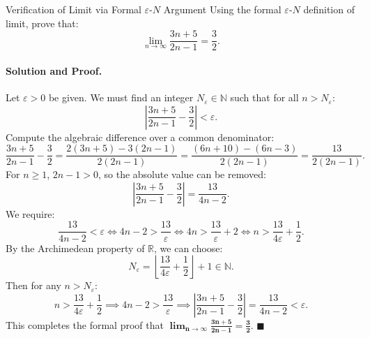 \begin{workedexample}{Verification of Limit via Formal $\varepsilon$-$N$ Argument}
Using the formal $\varepsilon$-$N$ definition of limit, prove that:
\[
\lim_{n \to \infty} \frac{3n + 5}{2n - 1} = \frac{3}{2}.
\]

\paragraph{Solution and Proof.}
Let $\varepsilon > 0$ be given. We must find an integer $N_\varepsilon \in \mathbb{N}$ such that for all $n > N_\varepsilon$:
\[
\left| \frac{3n + 5}{2n - 1} - \frac{3}{2} \right| < \varepsilon.
\]
Compute the algebraic difference over a common denominator:
\[
\frac{3n + 5}{2n - 1} - \frac{3}{2} = \frac{2(3n + 5) - 3(2n - 1)}{2(2n - 1)} = \frac{(6n + 10) - (6n - 3)}{2(2n - 1)} = \frac{13}{2(2n - 1)}.
\]
For $n \ge 1$, $2n - 1 > 0$, so the absolute value can be removed:
\[
\left| \frac{3n + 5}{2n - 1} - \frac{3}{2} \right| = \frac{13}{4n - 2}.
\]
We require:
\[
\frac{13}{4n - 2} < \varepsilon \iff 4n - 2 > \frac{13}{\varepsilon} \iff 4n > \frac{13}{\varepsilon} + 2 \iff n > \frac{13}{4\varepsilon} + \frac{1}{2}.
\]
By the Archimedean property of $\mathbb{R}$, we can choose:
\[
N_\varepsilon = \left\lfloor \frac{13}{4\varepsilon} + \frac{1}{2} \right\rfloor + 1 \in \mathbb{N}.
\]
Then for any $n > N_\varepsilon$:
\[
n > \frac{13}{4\varepsilon} + \frac{1}{2} \implies 4n - 2 > \frac{13}{\varepsilon} \implies \left| \frac{3n + 5}{2n - 1} - \frac{3}{2} \right| = \frac{13}{4n - 2} < \varepsilon.
\]
This completes the formal proof that $\mathbf{\lim_{n \to \infty} \frac{3n + 5}{2n - 1} = \frac{3}{2}}$. $\blacksquare$
\end{workedexample}


